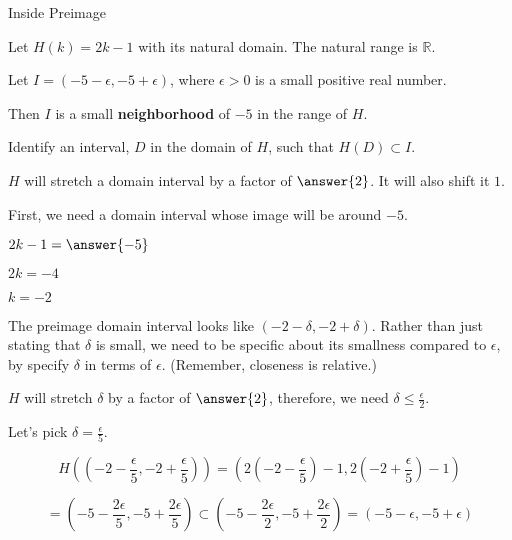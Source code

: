 \documentclass{ximera}
\begin{document}
\begin{example} Inside Preimage

Let $H(k) = 2k - 1$ with its natural domain.  The natural range is $\mathbb{R}$.

Let  $I = (-5-\epsilon, -5+\epsilon)$, where $\epsilon > 0$ is a small positive real number.  

Then $I$ is a small \textbf{neighborhood} of $-5$ in the range of $H$.


Identify an interval, $D$ in the domain of $H$, such that $H(D) \subset I$.

\begin{explanation}





$H$ will stretch a domain interval by a factor of $\answer{2}$.  It will also shift it $1$.  


First, we need a domain interval whose image will be around $-5$.

$2k - 1 = \answer{-5}$

$2k = -4$

$k = -2$



The preimage domain interval looks like $\left( -2 - \delta, -2 + \delta \right)$.  Rather than just stating that $\delta$ is small, we need to be specific about its smallness compared to $\epsilon$, by specify $\delta$ in terms of $\epsilon$. (Remember, closeness is relative.)

$H$ will stretch $\delta$ by a factor of $\answer{2}$, therefore,  we need $\delta \leq \frac{\epsilon}{2}$.   

Let's pick $\delta = \frac{\epsilon}{5}$. 




\[   H \left( \left( -2 - \frac{\epsilon}{5}, -2 + \frac{\epsilon}{5} \right) \right)  = \left( 2\left(-2 - \frac{\epsilon}{5}\right) - 1, 2\left(-2 + \frac{\epsilon}{5}\right) - 1  \right)\]


\[    = \left( -5 - \frac{2 \epsilon}{5} , -5 + \frac{2 \epsilon}{5} \right) \subset \left( -5 - \frac{2 \epsilon}{2} , -5 + \frac{2 \epsilon}{2} \right)  = (-5-\epsilon, -5+\epsilon) \]



\end{explanation}
\end{example}
\end{document}
